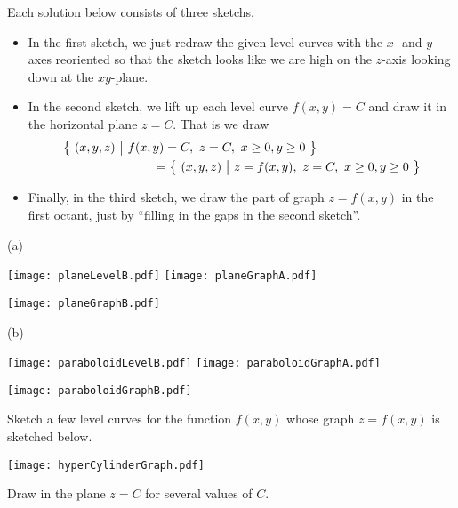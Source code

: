 \begin{solution}
Each solution below consists of three sketchs.
\begin{itemize}
\item 
In the first sketch, we just redraw the given level curves with the
$x$- and $y$-axes reoriented so that the sketch looks like we are high on the $z$-axis looking down at the $xy$-plane.

\item 
In the second sketch, we lift up each level curve $f(x,y)=C$ and draw it in 
the horizontal plane $z=C$. That is we draw 
\begin{align*}
&\big\{ \ (x,y,z)\ \big|\ f(x,y)=C,\ z=C,\ x\ge 0, y\ge 0\ \big\} \\
&\hskip1in=\big\{ \ (x,y,z)\ \big|\ z=f(x,y),\ z=C,\ x\ge 0, y\ge 0\ \big\}
\end{align*}

\item
Finally, in the third sketch, we draw the part of graph $z=f(x,y)$ in the
first octant, just by ``filling in the gaps in the second sketch''.
\end{itemize}

(a)
\begin{center}
  \texttt{[image: planeLevelB.pdf]}
\qquad
  \texttt{[image: planeGraphA.pdf]}
\end{center}

\begin{center}
  \texttt{[image: planeGraphB.pdf]}
\end{center}


(b)
\begin{center}
  \texttt{[image: paraboloidLevelB.pdf]}
\qquad
  \texttt{[image: paraboloidGraphA.pdf]}
\end{center}

\begin{center}
  \texttt{[image: paraboloidGraphB.pdf]}
\end{center}


\end{solution}


\begin{question}
Sketch a few level curves for the function $f(x,y)$ whose graph $z=f(x,y)$
is sketched below.
\begin{center}
  \texttt{[image: hyperCylinderGraph.pdf]}
\end{center}
\end{question}

\begin{hint}
Draw in the plane $z=C$ for several values of $C$. 
\end{hint}


